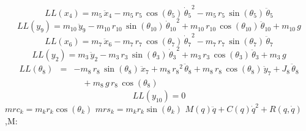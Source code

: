 \[ LL(x_{4}) = m_{5}\,{\ddot{x}_{4}} - m_{5}\,r_{5}\,\cos({\theta_{5}}
)\,{{\dot{\theta}_{5}}}^2 - m_{5}\,r_{5}\,\sin({\theta_{5}})\,{
\ddot{\theta}_{5}} \]
\[ LL(y_{9}) = m_{10}\,{\ddot{y}_{9}} - m_{10}\,r_{10}\,\sin({\theta_{
10}})\,{{\dot{\theta}_{10}}}^2 + m_{10}\,r_{10}\,\cos({\theta_{10}})\,
{\ddot{\theta}_{10}} + m_{10}\,g \]
\[ LL(x_{6}) = m_{7}\,{\ddot{x}_{6}} - m_{7}\,r_{7}\,\cos({\theta_{7}}
)\,{{\dot{\theta}_{7}}}^2 - m_{7}\,r_{7}\,\sin({\theta_{7}})\,{
\ddot{\theta}_{7}} \]
\[ LL(y_{2}) = m_{3}\,{\ddot{y}_{2}} - m_{3}\,r_{3}\,\sin({\theta_{3}}
)\,{{\dot{\theta}_{3}}}^2 + m_{3}\,r_{3}\,\cos({\theta_{3}})\,{
\ddot{\theta}_{3}} + m_{3}\,g \]
\begin{eqnarray*} LL({\theta_{8}}) &=& -m_{8}\,r_{8}\,\sin({\theta_{8}
})\,{\ddot{x}_{7}} + m_{8}\,{r_{8}}^2\,{\ddot{\theta}_{8}} + m_{8}\,r
_{8}\,\cos({\theta_{8}})\,{\ddot{y}_{7}} + J_{8}\,{\ddot{\theta}_{8}}
 \\ &&\quad\mbox{} + m_{8}\,g\,r_{8}\,\cos({\theta_{8}})
 \end{eqnarray*}
\[ LL(y_{10}) = 0 \]
$mrc_k=m_k r_k \cos(\theta_k)$
$mrs_k=m_k r_k \sin(\theta_k)$
$M(q)\ddot{q}+C(q)\dot{q}^2 +R(q,\dot{q})$,M:
 
